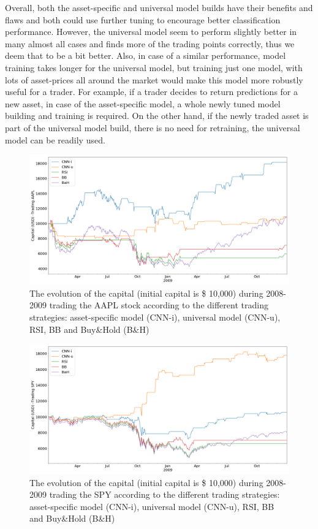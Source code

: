 \documentclass[11pt, a4paper]{article}
\begin{document}
Overall, both the asset-specific and universal model builds have their benefits and flaws and both could use further tuning to encourage better classification performance. However, the universal model seem to perform slightly better in many almost all cases and finds more of the trading points correctly, thus we deem that to be a bit better. Also, in case of a similar performance, model training takes longer for the universal model, but training just one model, with lots of asset-prices all around the market would make this model more robustly useful for a trader. 
For example, if a trader decides to return predictions for a new asset, in case of the asset-specific model, a whole newly tuned model building and training is required. On the other hand, if the newly traded asset is part of the universal model build, there is no need for retraining, the universal model can be readily used.
\begin{figure}[H]
    \centering
    \includegraphics[width=\textwidth]{images/capitals/Capitals2_AAPL.png}
    \caption{The evolution of the capital (initial capital is \$ 10,000) during 2008-2009 trading the AAPL stock according to the different trading strategies: asset-specific model (CNN-i), universal model (CNN-u), RSI, BB and Buy\&Hold (B\&H)}
    \label{fig:AAPLcapevol}
\end{figure}
\begin{figure}[H]
    \centering
    \includegraphics[width=\textwidth]{images/capitals/Capitals2_SPY.png}
    \caption{The evolution of the capital (initial capital is \$ 10,000) during 2008-2009 trading the SPY according to the different trading strategies: asset-specific model (CNN-i), universal model (CNN-u), RSI, BB and Buy\&Hold (B\&H)}
    \label{fig:SPYcapevol}
\end{figure}
\end{document}
